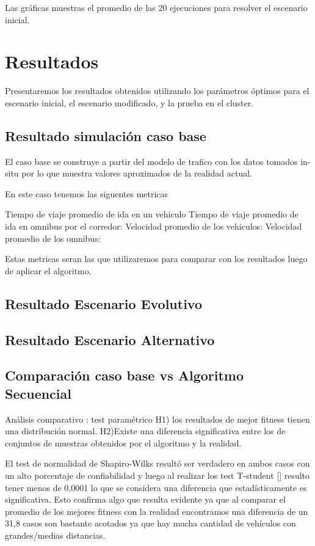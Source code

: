 Las gráficas muestras el promedio de las 20 ejecuciones para resolver el escenario inicial.







\section{Resultados}
Presentaremos los resultados obtenidos  utilizando los parámetros óptimos  para el escenario inicial, el escenario modificado, y la prueba en el cluster.

\subsection{Resultado simulación caso base}
El caso base se construye a partir del modelo de trafico con los datos tomados in-situ por lo que muestra valores aproximados de la realidad actual.

En este caso tenemos las siguentes metricas

Tiempo de viaje promedio de ida en un vehiculo
Tiempo de viaje promedio de ida en omnibus por el corredor:
Velocidad promedio de los vehiculos:
Velocidad promedio de los omnibus:

Estas metricas seran las que utilizaremos para comparar con los resultados luego de aplicar el algoritmo.

\subsection{Resultado Escenario Evolutivo}
\subsection{Resultado Escenario Alternativo}

\subsection{Comparación caso base vs Algoritmo Secuencial}
Análisis comparativo : test paramétrico
H1)  los  resultados  de  mejor  fitness  tienen  una distribución normal.
H2)Existe  una  diferencia  significativa  entre  los  de conjuntos  de  muestras  obtenidos  por  el  algoritmo  y  la realidad.

El  test  de  normalidad  de  Shapiro-Wilks  resultó  ser verdadero  en  ambos  casos  con  un  alto  porcentaje  de
confiabilidad y luego al realizar los test T-student [] resulto tener menos de 0,0001 lo que se considera una diferencia que
estadísticamente  es  significativa.  Esto confirma algo que resulta evidente ya que al comparar
el promedio de los mejores fitness con la realidad encontramos
una diferencia de un 31,8%
casos  son  bastante  acotados  ya  que  hay  mucha  cantidad  de
vehículos con grandes/medias distancias.

